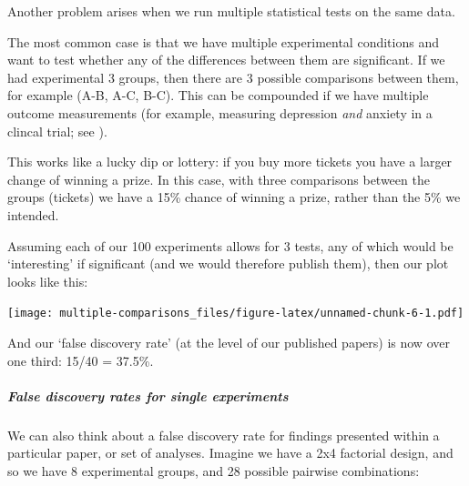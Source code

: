 \documentclass[]{article}
\let\oldsubparagraph\subparagraph
\renewcommand{\subparagraph}[1]{\oldsubparagraph{#1}\mbox{}}
\begin{document}
Another problem arises when we run multiple statistical tests on the same data.

The most common case is that we have multiple experimental conditions and want
to test whether any of the differences between them are significant. If we had
experimental 3 groups, then there are 3 possible comparisons between them, for
example (A-B, A-C, B-C). This can be compounded if we have multiple outcome
measurements (for example, measuring depression \emph{and} anxiety in a clincal
trial; see \citet{feise2002multiple}).

This works like a lucky dip or lottery: if you buy more tickets you have a
larger change of winning a prize. In this case, with three comparisons between
the groups (tickets) we have a 15\% chance of winning a prize, rather than the 5\%
we intended.

Assuming each of our 100 experiments allows for 3 tests, any of which would be
`interesting' if significant (and we would therefore publish them), then our
plot looks like this:

\texttt{[image: multiple-comparisons\_files/figure-latex/unnamed-chunk-6-1.pdf]}

And our `false discovery rate' (at the level of our published papers) is now
over one third: 15/40 = 37.5\%.

\hypertarget{false-discovery-rates-for-single-experiments}{%
\subparagraph{False discovery rates for single experiments}\label{false-discovery-rates-for-single-experiments}}

We can also think about a false discovery rate for findings presented within a
particular paper, or set of analyses. Imagine we have a 2x4 factorial design,
and so we have 8 experimental groups, and 28 possible pairwise combinations:
\end{document}
